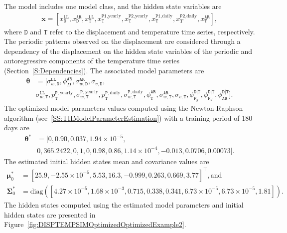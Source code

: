The model includes one model class, and the hidden state variables are 
\begin{gather*}
\textbf{x}=[x^{\mathtt{LL}}_{\mathtt{D}}, x^{\mathtt{AR}}_{\mathtt{D}}, x^{\mathtt{LL}}_{\mathtt{T}}, x^{\mathtt{P1}\text{,yearly}}_{\mathtt{T}}, x^{\mathtt{P2}\text{,yearly}}_{\mathtt{T}}, x^{\mathtt{P1}\text{,daily}}_{\mathtt{T}} , x^{\mathtt{P2}\text{,daily}}_{T}, x^{\mathtt{AR}}_{\mathtt{T}}],
\end{gather*}
where $\mathtt{D}$ and $\mathtt{T}$ refer to the displacement and temperature time series, respectively.
The periodic patterns observed on the displacement are considered through a dependency of the displacement on the hidden state variables of the periodic  and autoregressive components of the temperature time series (Section~\ref{S:Dependencies}).
The associated model parameters are
\begin{align*}
\bm\theta & =[\sigma_{w, \mathtt{D}}^{\mathtt{LL}}, \phi^{\mathtt{AR}}_{D}, \sigma_{w, \mathtt{D}}^{\mathtt{AR}}, \sigma_{v, \mathtt{D}},  \\
&  \sigma_{w, \mathtt{T}}^{\mathtt{LL}},  p^{\mathtt{P}, \text{yearly}}_{\mathtt{T}}, \sigma_{w, \mathtt{T}}^{\mathtt{P}, \text{yearly}} , p^{\mathtt{P}, \text{daily}}_{\mathtt{T}} , \sigma_{w, \mathtt{T}}^{\mathtt{P}, \text{daily}}, \phi^{\mathtt{AR}}_{\mathtt{T}}, \sigma_{w, \mathtt{T}}^{\mathtt{AR}}, \sigma_{v, \mathtt{T}},\phi^{\mathtt{D}|\mathtt{T}}_{\mathtt{P}_{y}},\phi^{\mathtt{D}|\mathtt{T}}_{\mathtt{P}_{d}},\phi^{\mathtt{D}|\mathtt{T}}_{\mathtt{AR}}].
\end{align*}
The optimized model parameters values computed using the Newton-Raphson algorithm (see~\ref{SS:THModelParameterEstimation}) with a training period of 180 days are
\begin{align*}
 \bm\theta^{\text{*}}& =[0, 0.90, 0.037, 1.94\times10^{-5},  \\
 & 0, 365.2422, 0, 1, 0, 0.98, 0.86, 1.14\times10^{-4}, -0.013, 0.0706, 0.00073 ].
\end{align*}
The estimated initial hidden states mean and covariance values are 
\begin{align*}
\bm \mu^{*}_{0} & = [	25.9,-2.55\times10^{-5},5.53,16.3,-0.999,0.263,0.669,3.77 ]^{\intercal}, \text{and} \\
\bm\Sigma^{*}_{0} & = \text{diag}([4.27\times10^{-5},1.68\times10^{-3},0.715,0.338,0.341,6.73\times10^{-5},6.73\times10^{-5},1.81]).
 \end{align*}
The hidden states computed using the estimated model parameters and initial hidden states are presented in Figure~\ref{fig:DISPTEMPSIMOptimizedOptimizedExample2}.


